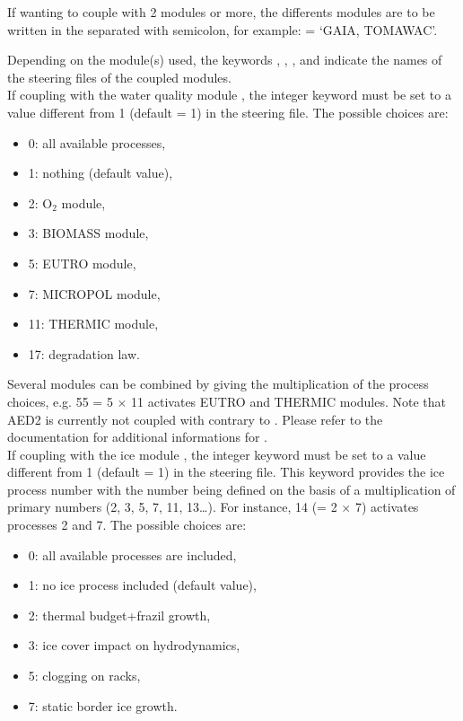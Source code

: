 If wanting to couple with 2 modules or more, the differents modules are to
be written in the  separated with semicolon, for example:
 = `GAIA, TOMAWAC'.

Depending on the module(s) used, the keywords
, ,
, 
and 
indicate the names of the steering files
of the coupled modules.\\

If coupling with the water quality module \waqtel, the integer keyword
 must be set to a value different from 1
(default = 1) in the  steering file.
The possible choices are:
\begin{itemize}
\item 0: all available processes,
\item 1: nothing (default value),
\item 2: O$_2$ module,
\item 3: BIOMASS module,
\item 5: EUTRO module,
\item 7: MICROPOL module,
\item 11: THERMIC module,
\item 17: degradation law.
\end{itemize}

Several modules can be combined by giving the multiplication of the process
choices, e.g. 55 = 5 $\times$ 11 activates EUTRO and THERMIC modules.
Note that AED2 is currently not coupled with  contrary to
.
Please refer to the \waqtel documentation for additional informations for
\waqtel.\\

If coupling with the ice module \khione, the integer keyword
 must be set to a value different from 1
(default = 1) in the  steering file.
This keyword provides the ice process number with the number being defined on
the basis of a multiplication of primary numbers (2, 3, 5, 7, 11, 13\ldots).
For instance, 14 (= 2 $\times$ 7) activates processes 2 and 7.
The possible choices are:
\begin{itemize}
\item 0: all available processes are included,
\item 1: no ice process included (default value),
\item 2: thermal budget+frazil growth,
\item 3: ice cover impact on hydrodynamics,
\item 5: clogging on racks,
\item 7: static border ice growth.
\end{itemize}


